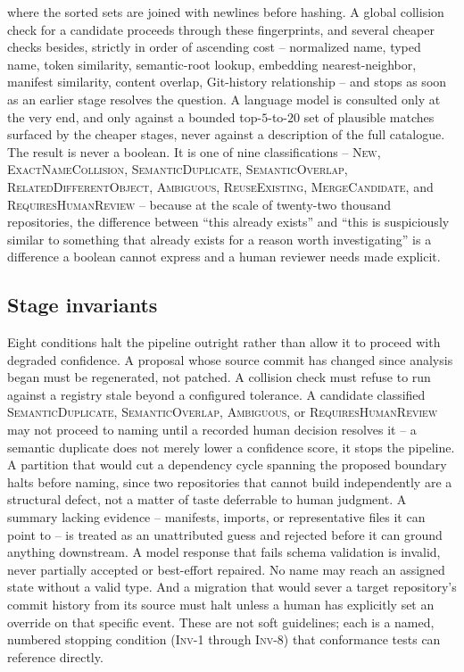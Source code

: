 \documentclass[11pt]{article}
\begin{document}
where the sorted sets are joined with newlines before hashing. A global collision check for a candidate proceeds through these fingerprints, and several cheaper checks besides, strictly in order of ascending cost -- normalized name, typed name, token similarity, semantic-root lookup, embedding nearest-neighbor, manifest similarity, content overlap, Git-history relationship -- and stops as soon as an earlier stage resolves the question. A language model is consulted only at the very end, and only against a bounded top-$5$-to-$20$ set of plausible matches surfaced by the cheaper stages, never against a description of the full catalogue. The result is never a boolean. It is one of nine classifications -- \textsc{New}, \textsc{ExactNameCollision}, \textsc{SemanticDuplicate}, \textsc{SemanticOverlap}, \textsc{RelatedDifferentObject}, \textsc{Ambiguous}, \textsc{ReuseExisting}, \textsc{MergeCandidate}, and \textsc{RequiresHumanReview} -- because at the scale of twenty-two thousand repositories, the difference between ``this already exists'' and ``this is suspiciously similar to something that already exists for a reason worth investigating'' is a difference a boolean cannot express and a human reviewer needs made explicit.

\subsection{Stage invariants}

Eight conditions halt the pipeline outright rather than allow it to proceed with degraded confidence. A proposal whose source commit has changed since analysis began must be regenerated, not patched. A collision check must refuse to run against a registry stale beyond a configured tolerance. A candidate classified \textsc{SemanticDuplicate}, \textsc{SemanticOverlap}, \textsc{Ambiguous}, or \textsc{RequiresHumanReview} may not proceed to naming until a recorded human decision resolves it -- a semantic duplicate does not merely lower a confidence score, it stops the pipeline. A partition that would cut a dependency cycle spanning the proposed boundary halts before naming, since two repositories that cannot build independently are a structural defect, not a matter of taste deferrable to human judgment. A summary lacking evidence -- manifests, imports, or representative files it can point to -- is treated as an unattributed guess and rejected before it can ground anything downstream. A model response that fails schema validation is invalid, never partially accepted or best-effort repaired. No name may reach an assigned state without a valid type. And a migration that would sever a target repository's commit history from its source must halt unless a human has explicitly set an override on that specific event. These are not soft guidelines; each is a named, numbered stopping condition (\textsc{Inv-1} through \textsc{Inv-8}) that conformance tests can reference directly.
\end{document}
